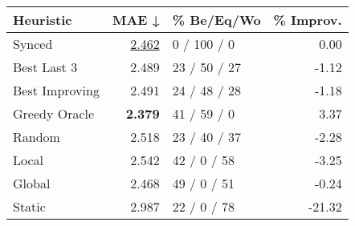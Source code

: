 \begin{tabular}{lrlr}
\toprule
\textbf{Heuristic} & \textbf{MAE ↓} & \textbf{\% Be/Eq/Wo} & \textbf{\% Improv.} \\
\midrule
            Synced &          \underline{2.462} &          0 / 100 / 0 &                0.00 \\
\midrule
       Best Last 3 &          2.489 &         23 / 50 / 27 &               -1.12 \\
    Best Improving &          2.491 &         24 / 48 / 28 &               -1.18 \\
\addlinespace
     Greedy Oracle &          \textbf{2.379} &          41 / 59 / 0 &                3.37 \\
            Random &          2.518 &         23 / 40 / 37 &               -2.28 \\
\midrule
             Local &          2.542 &          42 / 0 / 58 &               -3.25 \\
            Global &          2.468 &          49 / 0 / 51 &               -0.24 \\
\midrule
            Static &          2.987 &          22 / 0 / 78 &              -21.32 \\
\bottomrule
\end{tabular}

\label{tab:hr_non_lr05_le1_bs2_Summary}
